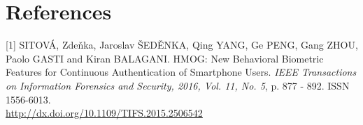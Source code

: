 \documentclass{article}
\begin{document}
\section*{References}

\small

[1] SITOVÁ, Zdeňka, Jaroslav ŠEDĚNKA, Qing YANG, Ge PENG, Gang ZHOU,
Paolo GASTI and Kiran BALAGANI. HMOG: New Behavioral Biometric Features
for Continuous Authentication of Smartphone Users. {\it IEEE Transactions on
Information Forensics and Security, 2016, Vol. 11, No. 5}, p. 877 - 892.
ISSN 1556-6013. \\ \url{http://dx.doi.org/10.1109/TIFS.2015.2506542}
\end{document}
